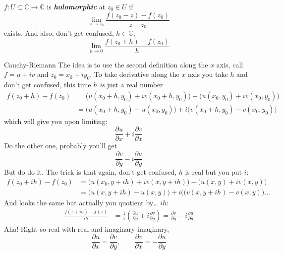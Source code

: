 \(f:U \subset \mathbb{C} \to \mathbb{C}\) is \textit{\textbf{holomorphic}} at \(z_0\in U\) if
\[\lim_{z \to z_0} \frac{f(z_0-z)-f(z_0)}{z-z_0}\]
exists. And also, don't get confused, \(h\in \mathbb{C}\),
\[\lim_{h \to 0} \frac{f(z_0+h)-f(z_0)}{h}\]

\begin{thing7}{Cauchy-Riemann}\leavevmode
The idea is to use the second definition along the \(x\) axis, call \(f=u+iv\) and  \(z_0=x_0+iy_0\). To take derivative along the \(x\) axis you take \(h\) and don't get confused, this time \(h\) \textit{is} just a real number
\begin{align*}f(z_0+h)-f(z_0)&=\Big(u(x_0+h,y_0)+iv(x_0+h,y_0)\Big)-\Big(u(x_0,y_0)+iv(x_0,y_0)\Big)\\
&=\Big(u(x_0+h,y_0)-u(x_0,y_0)\Big)+i\Big(v(x_0+h,y_0)-v(x_0,y_0)\Big)
\end{align*}
which will give you upon limiting:
\[\frac{\partial u}{\partial x}+i\frac{\partial v}{\partial x}\]
Do the other one, probably you'll get
\[\frac{\partial v}{\partial y}-i\frac{\partial u}{\partial y}\]
But do do it. The trick is that again, don't get confused, \(h\) is real but you put \(i\):
\begin{align*}
f(z_0+ih)-f(z_0)&=\Big(u(x_0,y+ih)+iv(x,y+ih)\Big)-\Big(u(x,y)+iv(x,y)\Big)\\
&=\Big(u(x,y+ih)-u(x,y)\Big)+i\Big((v(x,y+ih)-v(x,y)\Big)\ldots
\end{align*}
And looks the same but actually you quotient by… \(ih\):
\begin{align*}\frac{f(z+ih)-f(z)}{ih}&=\frac{1}{i}\left(\frac{\partial u}{\partial y}+i\frac{\partial v}{\partial y}\right)=\frac{\partial v}{\partial y}-i\frac{\partial u}{\partial y}
	\end{align*}
Aha! Right so real with real and imaginary-imaginary,
\[\boxed{\frac{\partial u}{\partial x}=\frac{\partial v}{\partial y},\qquad \frac{\partial v}{\partial x}=-\frac{\partial u}{\partial y}}\]
\end{thing7}

